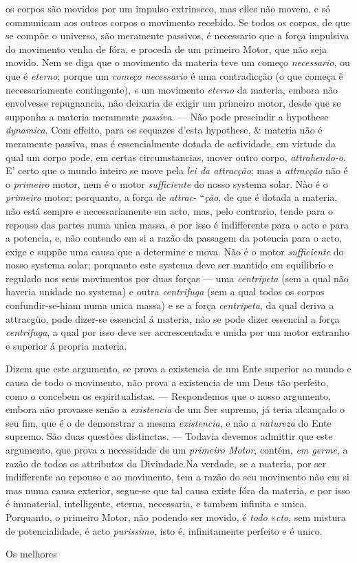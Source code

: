 os corpos são movidos por um impulso extrinseco, mas elles não movem, e só communicam aos outros corpos o movimento recebido. Se todos os corpos, de que se compõe o universo, são meramente passivos, é necessario que a força impulsiva do movimento venha de fóra, e proceda de um primeiro Motor, que não seja movido. Nem se diga que o movimento da materia teve um começo \emph{necessario}, ou que é \emph{eterno}; porque um \emph{começo necessario} é uma contradicção (o que começa ê necessariamente contingente), \emph{e} um movimento \emph{eterno} da materia, embora não envolvesse repugnancia, não deixaria de exigir um primeiro motor, desde que se supponha a materia meramente \emph{passiva}. --- Não pode prescindir a hypothese \emph{dynamica}. Com effeito, para os sequazes d'esta hypothese, \& materia não é meramente passiva, mas é essencialmente dotada de actividade, em virtude da qual um corpo pode, em certas circumstancias, mover outro corpo, \emph{attrahendo-o}. E' certo que o mundo inteiro se move pela \emph{lei da attracção}; mas a \emph{attracção} não é o \emph{primeiro} motor, nem é o motor \emph{sufficiente} do nosso systema solar. Nào é o \emph{primeiro} motor; porquanto, a força de \emph{attrac}- “\emph{ção}, de que é dotada a materia, não está sempre e necessariamente em acto, mas, pelo contrario, tende para o repouso das partes numa unica massa, e por isso é indifferente para o acto e para a potencia, e, não contendo em si a razão da passagem da potencia para o acto, exige e suppõe uma causa que a determine e mova. Não é o motor \emph{sufficiente} do nosso systema solar; porquanto este systema deve ser mantido em equilibrio e regulado nos seus movimentos por duas forças --- uma \emph{centripeta} (sem a qual não haveria unidade no systema) e outra \emph{centrifuga} (sem a qual todos os corpos confundir-se-hiam numa unica massa) e se a força \emph{centripeta}, da qual deriva a attracgüo, pode dizer-se essencial á materia, não se pode dizer essencial a força \emph{centrifuga}, a qual por isso deve ser accrescentada e unida por um motor extranho e superior á propria materia.\par Dizem que este argumento, se prova a existencia de um Ente superior ao mundo e causa de todo o movimento, não prova a existencia de um Deus tão perfeito, como o concebem os espiritualistas. --- Respondemos que o nosso argumento, embora não provasse senão a \emph{existencia} de um Ser supremo, já teria alcançado o seu fim, que é o de demonstrar a mesma \emph{existencia}, e não a \emph{natureza} do Ente supremo. São duas questões distinctas. --- Todavia devemos admittir que este argumento, que prova a necessidade de um \emph{primeiro Motor}, contém, \emph{em germe}, a razão de todos os attributos da Divindade.Na verdade, se a materia, por ser indifferente ao repouso e ao movimento, tem a razão do seu movimento não em si mas numa causa exterior, segue-se que tal causa existe fóra da materia, e por isso é immaterial, intelligente, eterna, necessaria, e tambem infinita e unica. Porquanto, o primeiro Motor, não podendo ser movido, é \emph{todo} «\emph{cto}, sem mistura de potencialidade, é acto \emph{purissimo}, isto é, infinitamente perfeito e é unico.\par Os melhores 